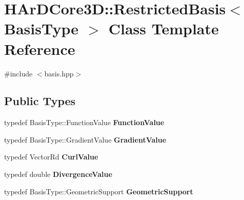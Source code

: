 \hypertarget{classHArDCore3D_1_1RestrictedBasis}{}\section{H\+Ar\+D\+Core3D\+:\+:Restricted\+Basis$<$ Basis\+Type $>$ Class Template Reference}
\label{classHArDCore3D_1_1RestrictedBasis}


{\ttfamily \#include $<$basis.\+hpp$>$}

\subsection*{Public Types}
\begin{DoxyCompactItemize}
\item 
\mbox{\label{classHArDCore3D_1_1RestrictedBasis_a18961cbc662cb9fb42904da5d95203ea}} 
typedef Basis\+Type\+::\+Function\+Value {\bfseries Function\+Value}
\item 
\mbox{\label{classHArDCore3D_1_1RestrictedBasis_a7f6e5f17678f51833321612e93f4963b}} 
typedef Basis\+Type\+::\+Gradient\+Value {\bfseries Gradient\+Value}
\item 
\mbox{\label{classHArDCore3D_1_1RestrictedBasis_a6bcd1c81b6198d9db1d5e9342c5625fe}} 
typedef Vector\+Rd {\bfseries Curl\+Value}
\item 
\mbox{\label{classHArDCore3D_1_1RestrictedBasis_a7139d7ecaa9d2985dabf2a0a0c2022f4}} 
typedef double {\bfseries Divergence\+Value}
\item 
\mbox{\label{classHArDCore3D_1_1RestrictedBasis_a96c46cc3be4f7fde66e70a1001c670d0}} 
typedef Basis\+Type\+::\+Geometric\+Support {\bfseries Geometric\+Support}
\end{DoxyCompactItemize}
